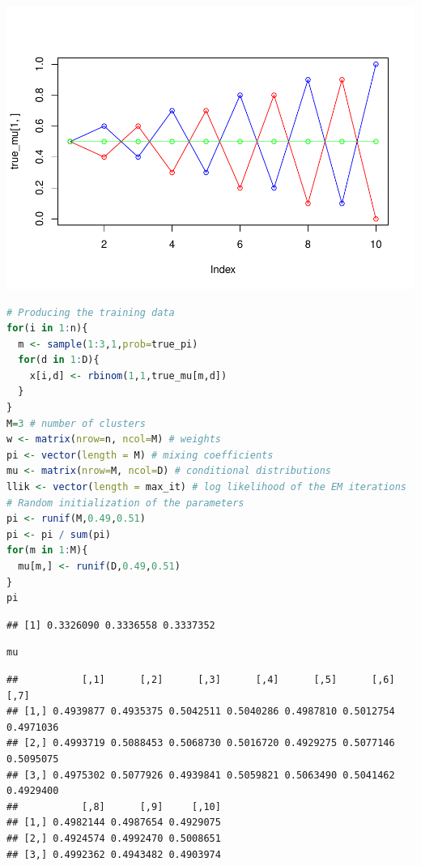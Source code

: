 \documentclass[
]{article}
\begin{document}
\includegraphics{Block2Lab1_files/figure-latex/2.1-1.pdf}

\begin{lstlisting}[language=R]
# Producing the training data
for(i in 1:n){
  m <- sample(1:3,1,prob=true_pi)
  for(d in 1:D){
    x[i,d] <- rbinom(1,1,true_mu[m,d])
  }
}
M=3 # number of clusters
w <- matrix(nrow=n, ncol=M) # weights
pi <- vector(length = M) # mixing coefficients
mu <- matrix(nrow=M, ncol=D) # conditional distributions
llik <- vector(length = max_it) # log likelihood of the EM iterations
# Random initialization of the parameters
pi <- runif(M,0.49,0.51)
pi <- pi / sum(pi)
for(m in 1:M){
  mu[m,] <- runif(D,0.49,0.51)
}
pi
\end{lstlisting}

\begin{lstlisting}
## [1] 0.3326090 0.3336558 0.3337352
\end{lstlisting}

\begin{lstlisting}[language=R]
mu
\end{lstlisting}

\begin{lstlisting}
##           [,1]      [,2]      [,3]      [,4]      [,5]      [,6]      [,7]
## [1,] 0.4939877 0.4935375 0.5042511 0.5040286 0.4987810 0.5012754 0.4971036
## [2,] 0.4993719 0.5088453 0.5068730 0.5016720 0.4929275 0.5077146 0.5095075
## [3,] 0.4975302 0.5077926 0.4939841 0.5059821 0.5063490 0.5041462 0.4929400
##           [,8]      [,9]     [,10]
## [1,] 0.4982144 0.4987654 0.4929075
## [2,] 0.4924574 0.4992470 0.5008651
## [3,] 0.4992362 0.4943482 0.4903974
\end{lstlisting}
\end{document}
